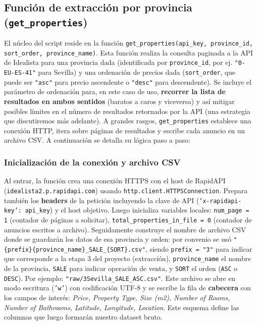 \documentclass[a4paper,11pt]{book}
\begin{document}
\subsection*{Función de extracción por provincia (\texttt{get\_properties})}
El núcleo del script reside en la función \texttt{get\_properties(api\_key, province\_id, sort\_order, province\_name)}. Esta función realiza la consulta paginada a la API de Idealista para una provincia dada (identificada por \texttt{province\_id}, por ej. \texttt{"0-EU-ES-41"} para Sevilla) y una ordenación de precios dada (\texttt{sort\_order}, que puede ser \texttt{"asc"} para precio ascendente o \texttt{"desc"} para descendente). Se incluye el parámetro de ordenación para, en este caso de uso, \textbf{recorrer la lista de resultados en ambos sentidos} (baratos a caros y viceversa) y así mitigar posibles límites en el número de resultados retornados por la API (una estrategia que discutiremos más adelante). A grandes rasgos, \texttt{get\_properties} establece una conexión HTTP, itera sobre páginas de resultados y escribe cada anuncio en un archivo CSV. A continuación se detalla su lógica paso a paso:

\subsubsection*{Inicialización de la conexión y archivo CSV}
Al entrar, la función crea una conexión HTTPS con el host de RapidAPI (\texttt{idealista2.p.rapidapi.com}) usando \texttt{http.client.HTTPSConnection}. Prepara también los \textbf{headers} de la petición incluyendo la clave de API (\texttt{'x-rapidapi-key': api\_key}) y el host objetivo. Luego inicializa variables locales: \texttt{num\_page = 1} (contador de páginas a solicitar), \texttt{total\_properties\_in\_file = 0} (contador de anuncios escritos a archivo). Seguidamente construye el nombre de archivo CSV donde se guardarán los datos de esa provincia y orden: por convenio se usó \texttt{"\{prefix\}\{province\_name\}\_SALE\_\{SORT\}.csv"}, siendo \texttt{prefix = "3"} para indicar que corresponde a la etapa 3 del proyecto (extracción), \texttt{province\_name} el nombre de la provincia, \texttt{SALE} para indicar operación de venta, y \texttt{SORT} el orden (\texttt{ASC} o \texttt{DESC}). Por ejemplo: \texttt{"raw/3Sevilla\_SALE\_ASC.csv"}. Este archivo se abre en modo escritura (\texttt{'w'}) con codificación UTF-8 y se escribe la fila de \textbf{cabecera} con los campos de interés: \textit{Price, Property Type, Size (m2), Number of Rooms, Number of Bathrooms, Latitude, Longitude, Location}. Este esquema define las columnas que luego formarán nuestro dataset bruto.
\end{document}
